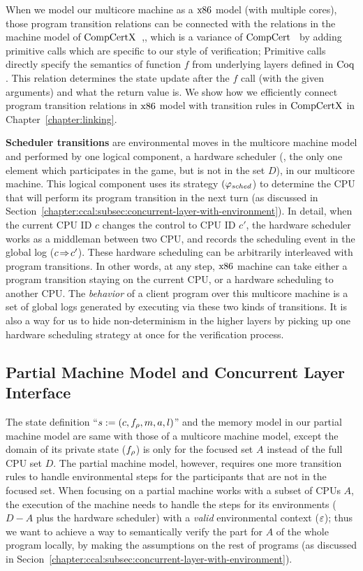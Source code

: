 When we model our multicore machine as a $\mathrm{x86}$ model (with multiple cores),
those program transition relations can be connected with the relations 
in the machine model of $\mathrm{CompCertX}$~\cite{deepspec},, 
which is a variance of $\mathrm{CompCert}$~\cite{leroy09}
by adding primitive calls which are specific to our style of verification;
Primitive calls directly specify the semantics of function $f$ from underlying layers defined in $\mathrm{Coq}$. 
This relation determines the state update after the $f$ call (with the given arguments) and what the return value is.
We show how we efficiently connect program transition relations in 
$\mathrm{x86}$ model with transition rules in $\mathrm{CompCertX}$ in Chapter~\ref{chapter:linking}.

\textbf{Scheduler transitions} are environmental moves in the multicore machine model and
 performed by one logical component, a hardware scheduler  (\ie, the only one element which participates in the game, but is not in the set $D$),
  in our multicore machine.
This logical component uses its strategy  $(\varphi_{sched}$)
to determine  the CPU that will perform its program transition 
in the next turn (as discussed in Section~\ref{chapter:ccal:subsec:concurrent-layer-with-environment}).
In detail, when the current CPU ID $c$ changes
the control to CPU ID $c'$,
the hardware scheduler works as a
middleman between 
two CPU, and records the scheduling event 
in the global log ($c \!\Rightarrow\! c'$).
These hardware scheduling
can be arbitrarily interleaved with
program transitions.
In other words, at any step,
$\mathrm{x86}$ machine can take either a program transition staying
on the current CPU,
or a hardware scheduling to another CPU.
The \emph{behavior} of a client program  over this multicore machine is a set of global logs generated by executing  via these two kinds of transitions.
It is also a way for us to hide non-determinism in the higher layers
by picking up 
one hardware scheduling strategy at once for the verification process.




\subsection{Partial  Machine Model and Concurrent Layer Interface}
\label{chapter:ccal:subsec:concurrent-layer-interface}

The state definition ``$s := (c, f_{\rho}, m, a, l)$'' and the memory model in our partial machine model are
same with those of a multicore machine model, 
except the domain of its private state ($f_{\rho}$) is only for the focused set $A$ instead of the full CPU set $D$.
The partial machine model, however, requires one more transition rules to handle  environmental steps for the participants that are not in the focused set.
When focusing on a partial machine works with a subset of CPUs $A$,
the execution of the machine needs to handle 
the steps for its environments ($D - A$ plus the hardware scheduler) with a \textit{valid} environmental context (${\varepsilon}$);
thus we want to  achieve a way to semantically verify the part for $A$ of the whole program locally, 
by making the assumptions on the rest of programs (as discussed in Secion~\ref{chapter:ccal:subsec:concurrent-layer-with-environment}).


